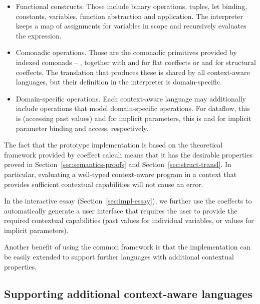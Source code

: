 \begin{itemize}
\item {\sc Functional constructs.} Those include binary operations, tuples, let binding,
  constants, variables, function abstraction and application. The interpreter keeps a map of
  assignments for variables in scope and recursively evaluates the expression.

\item {\sc Comonadic operations.} Those are the comonadic primitives provided by indexed comonads --
  ,  together with  and  for flat coeffects
  or  and  for structural coeffects. The translation that produces these
  is shared by all context-aware languages, but their definition in the interpreter is
  domain-specific.

\item {\sc Domain-specific operations.} Each context-aware language may additionally include
  operations that model domain-specific operations. For dataflow, this is  (accessing
  past values) and for implicit parameters, this is  and  for implicit
  parameter binding and access, respectively.
\end{itemize}

\noindent
The fact that the prototype implementation is based on the theoretical framework provided by
coeffect calculi means that it has the desirable properties proved in Section~\ref{sec:semantics-proofs}
and Section~\ref{sec:struct-transl}. In particular, evaluating a well-typed context-aware program in
a context that provides sufficient contextual capabilities will not cause an error.

In the interactive essay (Section~\ref{sec:impl-essay}), we further use the coeffects to
automatically generate a user interface that requires the user to provide the required contextual
capabilities (past values for individual variables, or values for implicit parameters).

Another benefit of using the common framework is that the implementation can be easily extended
to support further languages with additional contextual properties.


\subsection{Supporting additional context-aware languages}
\label{sec:impl-theory-ext}

